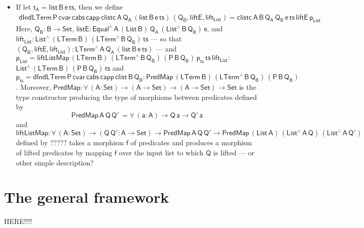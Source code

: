 \documentclass[9pt]{entcs}
\begin{document}
\begin{itemize}
\item If let $\mathsf{t_A = list \,B \,e \, ts}$, then we define
\begin{multline*}
  \mathsf{dIndLTerm \, P\, cvar \, cabs\, capp\, clistc \, A\, Q_A\, (list \,B \,e \, ts) \, (Q_B , liftE, lift_{List})
  = clistc \,A\,B\,Q_A\, Q_B\, e\, ts\, liftE\, p_{List} }
\end{multline*}
Here, $\mathsf{Q_B : B \to Set}$, $\mathsf{listE : Equal^{\wedge}\,
  A\, (List\,B)\, Q_A\, (List^{\wedge}\, B\, Q_B)\, e}$, and
$\mathsf{lift_{List}: List^{\wedge} \, (LTerm\, B) \,
  (LTerm^{\wedge}\, B\, Q_B) \, ts}$ --- so that $\mathsf{(Q_B ,
  liftE, lift_{List}): LTerm^{\wedge}\, A\, Q_A\, (list \,B \,e \,
  ts)}$ --- and
$\mathsf{p_{List} = liftListMap \, (LTerm\, B) \, (LTerm^{\wedge} \, B
  \, Q_B)\, (P\,B\,Q_B)\, p_{ts} \, ts\, lift_{List} : }$\\
$\mathsf{List^{\wedge}\,
  (LTerm\,B) \, (P\,B\,Q_B) \, ts}$ and
$\mathsf{ p_{ts} = dIndLTerm\, P\, cvar\, cabs\, capp\, clist\, B\,
  Q_B : PredMap\,(LTerm\,B) \,(LTerm^{\wedge}\, B\, Q_B) \,
  (P\,B\,Q_B)}$. Moreover, $\mathsf{PredMap : \forall\, (A : Set) \to
  (A \to Set) \to   (A \to Set) \to Set }$ is the type constructor
producing the type of morphisms between predicates defined by
\[\mathsf{PredMap \,A\, Q\,Q'\, = \forall\, (a : A) \to Q\,a \to
  Q'\,a}\] and $\mathsf{liftListMap : \forall\, (A : Set) \to (Q \, Q'
  : A \to Set) \to PredMap\,A\,Q\,Q' \to PredMap\,(List\,A)
  \,(List^{\wedge}\, A\, Q)\, (List^{\wedge}\, A\, Q')}$ {\color{red}
  defined by ?????} takes a morphism $\mathsf{f}$ of predicates and
produces a morphism of lifted predicates {\color{red} by mapping
  $\mathsf{f}$ over the input list to which $\mathsf{Q}$ is lifted ---
  or other simple description?}
\end{itemize}



\section{The general framework}\label{sec:framework}

{\color{red} HERE!!!!}
\end{document}
